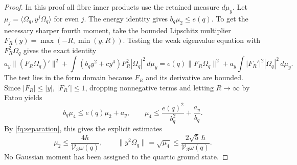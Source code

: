 \begin{proof}
In this proof all fibre inner products use the retained measure
$d\mu_y$. Let $\mu_j=\langle\Omega_q,y^j\Omega_q\rangle$ for
even $j$. The energy identity gives $b_q\mu_2\leq e(q)$.
To get the necessary sharper fourth moment, take the bounded
Lipschitz multiplier $F_R(y)=\max(-R,\min(y,R))$.
Testing the weak eigenvalue equation with $F_R^2\Omega_q$ gives
the exact identity
\[
 a_y\|(F_R\Omega_q)'\|^2
 +\int(b_qy^2+cy^4)F_R^2|\Omega_q|^2\,d\mu_y
 =e(q)\|F_R\Omega_q\|^2
          +a_y\int|F_R'|^2|\Omega_q|^2\,d\mu_y.
\]
The test lies in the form domain because $F_R$ and its derivative
are bounded. Since $|F_R|\leq|y|$, $|F_R'|\leq1$, dropping
nonnegative terms and letting $R\to\infty$ by Fatou yields
\[
 b_q\mu_4\leq e(q)\mu_2+a_y,
 \qquad \mu_4\leq\frac{e(q)^2}{b_q^2}+\frac{a_y}{b_q}.
\]
By \eqref{fq:separation}, this gives the explicit estimates
\begin{equation}\label{fq:moments}
 \mu_2\leq\frac{4\hbar}{\mathcal V_3\omega(q)},\qquad
 \|y^2\Omega_q\|=\sqrt{\mu_4}
       \leq\frac{2\sqrt5\,\hbar}{\mathcal V_3\omega(q)}.
\end{equation}
No Gaussian moment has been assigned to the quartic ground state.


\end{proof}

